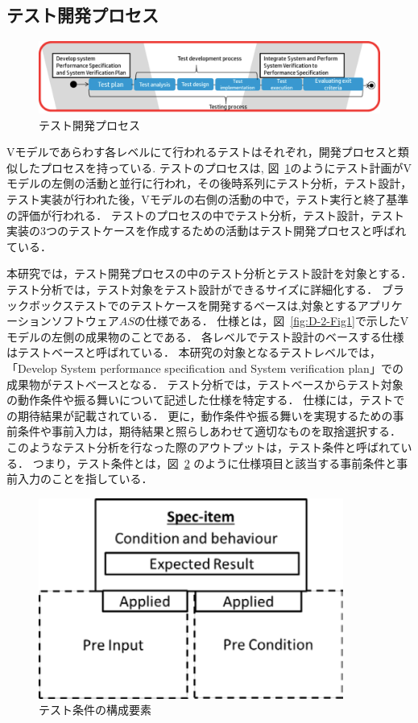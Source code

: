 \subsection{テスト開発プロセス}
\begin{figure}[htbp]
  \begin{center}
  \includegraphics[width=14cm]{./image/D-2-Fig2.png}
  \caption{テスト開発プロセス}
  \label{fig:D-2-Fig2}
  \end{center}
\end{figure}
Vモデルであらわす各レベルにて行われるテストはそれぞれ，開発プロセスと類似したプロセスを持っている.
テストのプロセスは, 図~\ref{fig:D-2-Fig2}のようにテスト計画がVモデルの左側の活動と並行に行われ，その後時系列にテスト分析，テスト設計，テスト実装が行われた後，Vモデルの右側の活動の中で，テスト実行と終了基準の評価が行われる．
テストのプロセスの中でテスト分析，テスト設計，テスト実装の3つのテストケースを作成するための活動はテスト開発プロセスと呼ばれている\cite{ISTQB}．

本研究では，テスト開発プロセスの中のテスト分析とテスト設計を対象とする．
テスト分析では，テスト対象をテスト設計ができるサイズに詳細化する．
ブラックボックステストでのテストケースを開発するベースは,対象とするアプリケーションソフトウェア$AS$の仕様である．
仕様とは，図~\ref{fig:D-2-Fig1}で示したVモデルの左側の成果物のことである．
各レベルでテスト設計のベースする仕様はテストベースと呼ばれている．
本研究の対象となるテストレベルでは，「Develop System performance specification and System verification plan」での成果物がテストベースとなる．
テスト分析では，テストベースからテスト対象の動作条件や振る舞いについて記述した仕様を特定する．
仕様には，テストでの期待結果が記載されている．
更に，動作条件や振る舞いを実現するための事前条件や事前入力は，期待結果と照らしあわせて適切なものを取捨選択する．
このようなテスト分析を行なった際のアウトプットは，テスト条件と呼ばれている．
つまり，テスト条件とは，図~\ref{fig:D-4-Fig1} のように仕様項目と該当する事前条件と事前入力のことを指している．
\begin{figure}[h]
  \begin{center}
  \includegraphics[width=10cm]{./image/D-4-Fig1.png}
  \caption{テスト条件の構成要素}
  \label{fig:D-4-Fig1}
  \end{center}
   \end{figure}


